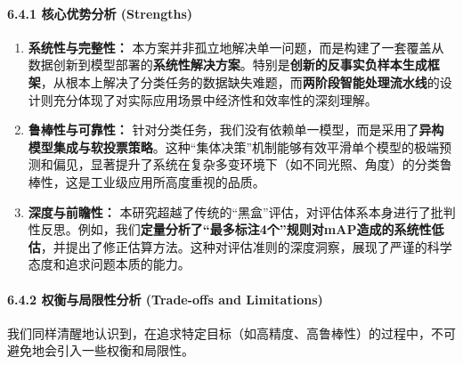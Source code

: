\documentclass[
]{article}
\begin{document}
\paragraph{\texorpdfstring{\textbf{6.4.1 核心优势分析
(Strengths)}}{6.4.1 核心优势分析 (Strengths)}}\label{641-ux6838ux5fc3ux4f18ux52bfux5206ux6790-strengths}

\begin{enumerate}
\def\labelenumi{\arabic{enumi}.}
\item
  \textbf{系统性与完整性：}
  本方案并非孤立地解决单一问题，而是构建了一套覆盖从数据创新到模型部署的\textbf{系统性解决方案}。特别是\textbf{创新的反事实负样本生成框架}，从根本上解决了分类任务的数据缺失难题，而\textbf{两阶段智能处理流水线}的设计则充分体现了对实际应用场景中经济性和效率性的深刻理解。
\item
  \textbf{鲁棒性与可靠性：}
  针对分类任务，我们没有依赖单一模型，而是采用了\textbf{异构模型集成与软投票策略}。这种``集体决策''机制能够有效平滑单个模型的极端预测和偏见，显著提升了系统在复杂多变环境下（如不同光照、角度）的分类鲁棒性，这是工业级应用所高度重视的品质。
\item
  \textbf{深度与前瞻性：}
  本研究超越了传统的``黑盒''评估，对评估体系本身进行了批判性反思。例如，我们\textbf{定量分析了``最多标注4个''规则对mAP造成的系统性低估}，并提出了修正估算方法。这种对评估准则的深度洞察，展现了严谨的科学态度和追求问题本质的能力。
\end{enumerate}

\paragraph{\texorpdfstring{\textbf{6.4.2 权衡与局限性分析 (Trade-offs
and
Limitations)}}{6.4.2 权衡与局限性分析 (Trade-offs and Limitations)}}\label{642-ux6743ux8861ux4e0eux5c40ux9650ux6027ux5206ux6790-trade-offs-and-limitations}

我们同样清醒地认识到，在追求特定目标（如高精度、高鲁棒性）的过程中，不可避免地会引入一些权衡和局限性。
\end{document}
